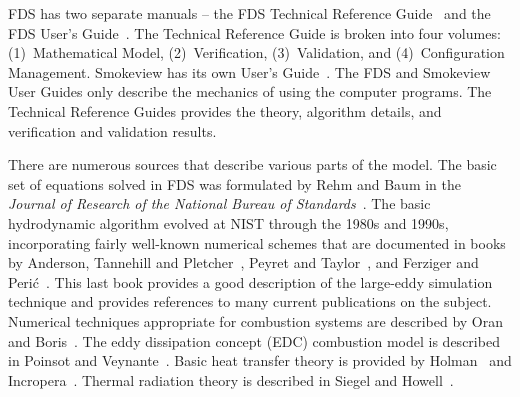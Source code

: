 \documentclass[11pt]{book}
\begin{document}
\label{Relevantdocs}

FDS has two separate manuals -- the FDS Technical Reference Guide~\cite{FDS_Tech_Guide} and the FDS User's Guide~\cite{FDS_Users_Guide}. The Technical Reference Guide is broken into four volumes: (1)~Mathematical Model, (2)~Verification, (3)~Validation, and (4)~Configuration Management. Smokeview has its own User's Guide~\cite{Smokeview_Users_Guide}. The FDS and Smokeview User Guides only describe the mechanics of using the computer programs. The Technical Reference Guides provides the theory, algorithm details, and verification and validation results.

There are numerous sources that describe various parts of the model. The basic set of equations solved in FDS was formulated by Rehm and Baum in the {\em Journal of Research of the National Bureau of Standards}~\cite{Rehm:1}.  The basic hydrodynamic algorithm evolved at NIST through the 1980s and 1990s, incorporating fairly well-known numerical schemes that are documented in books by Anderson, Tannehill and Pletcher~\cite{Anderson:1}, Peyret and Taylor~\cite{Peyret:1}, and Ferziger and Peri\'{c}~\cite{Ferziger:1}. This last book provides a good description of the large-eddy simulation technique and provides references to many current publications on the subject.  Numerical techniques appropriate for combustion systems are described by Oran and Boris~\cite{Oran:1}.  The eddy dissipation concept (EDC) combustion model is described in Poinsot and Veynante~\cite{Poinsot:TNC}. Basic heat transfer theory is provided by Holman~\cite{Holman:1} and Incropera~\cite{Incropera:1}. Thermal radiation theory is described in Siegel and Howell~\cite{Siegel:1}.
\end{document}

